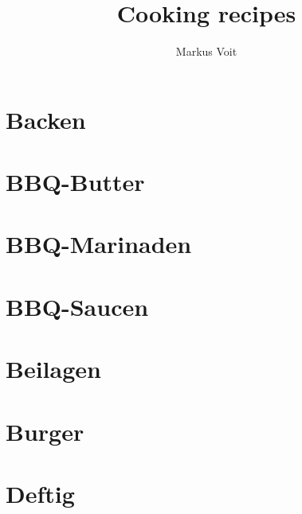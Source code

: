 \documentclass[
  DIV=11,%
  pagesize,%
  fontsize=11pt,%
  paper=a4,%
  numbers=noenddot,
]{scrartcl}
\title{Cooking recipes}
\author{Markus Voit}
\begin{document}
\maketitle
\clearpage

\tableofcontents
\clearpage

\section{Backen}
\newpage
\newpage

\section{BBQ-Butter}
\newpage
\newpage
\newpage
\newpage
\newpage

\section{BBQ-Marinaden}
\newpage
\newpage
\newpage

\section{BBQ-Saucen}
\newpage
\newpage
\newpage
\newpage
\newpage
\newpage
\newpage

\section{Beilagen}
\newpage

\section{Burger}
\newpage
\newpage

\section{Deftig}
\newpage
\newpage
\newpage
\newpage
\end{document}

